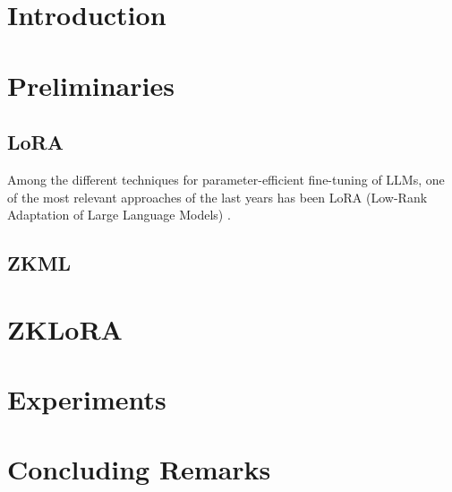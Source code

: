 \documentclass{article}
\begin{document}
\section{Introduction}



\section{Preliminaries}


\subsection{LoRA}
Among the different techniques for parameter-efficient fine-tuning of LLMs, one of the most relevant approaches of the last years has been LoRA (Low-Rank Adaptation of Large Language Models) \cite{hu2021lora}.

\subsection{ZKML}




\section{ZKLoRA}

\section{Experiments}



\section{Concluding Remarks}




\end{document}
